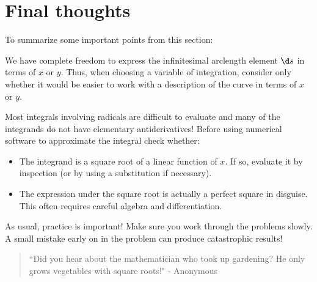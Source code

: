\documentclass{ximera}
\begin{document}
\section{Final thoughts}
To summarize some important points from this section:


\begin{fact}
We have complete freedom to express the infinitesimal arclength element $\d s$ in terms of $x$ or $y$.  Thus, when choosing a variable of integration, consider only whether it would be easier to work with a description of the curve in terms of $x$ or $y$.\end{fact}

\begin{fact}
Most integrals involving radicals are difficult to evaluate and many of the integrands do not have elementary antiderivatives!  Before using numerical software to approximate the integral check whether:

\begin{itemize}
\item The integrand is a square root of a linear function of $x$.  If so, evaluate it by inspection (or by using a substitution if necessary).
\item The expression under the square root is actually a perfect square in disguise.  This often requires careful algebra and differentiation.
\end{itemize}
\end{fact}

As usual, practice is important!  Make sure you work through the problems slowly.  A small mistake early on in the problem can produce catastrophic results!

\begin{quote}
``Did you hear about the mathematician who took up gardening?  He only grows vegetables with square roots!" - Anonymous
\end{quote}
\end{document}
